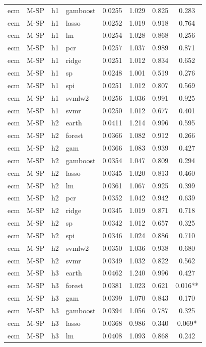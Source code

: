 \begin{ThreePartTable}
\begin{longtable}[t]{llclcccc}
ecm & M-SP & h1 & gamboost & 0.0255 & 1.029 & 0.825 & 0.283\\
ecm & M-SP & h1 & lasso & 0.0252 & 1.019 & 0.918 & 0.764\\
ecm & M-SP & h1 & lm & 0.0254 & 1.028 & 0.868 & 0.256\\
ecm & M-SP & h1 & pcr & 0.0257 & 1.037 & 0.989 & 0.871\\
ecm & M-SP & h1 & ridge & 0.0251 & 1.012 & 0.834 & 0.652\\
ecm & M-SP & h1 & sp & 0.0248 & 1.001 & 0.519 & 0.276\\
ecm & M-SP & h1 & spi & 0.0251 & 1.012 & 0.807 & 0.569\\
ecm & M-SP & h1 & svmlw2 & 0.0256 & 1.036 & 0.991 & 0.925\\
ecm & M-SP & h1 & svmr & 0.0250 & 1.012 & 0.677 & 0.401\\
\addlinespace
ecm & M-SP & h2 & earth & 0.0411 & 1.214 & 0.996 & 0.595\\
ecm & M-SP & h2 & forest & 0.0366 & 1.082 & 0.912 & 0.266\\
ecm & M-SP & h2 & gam & 0.0366 & 1.083 & 0.939 & 0.427\\
ecm & M-SP & h2 & gamboost & 0.0354 & 1.047 & 0.809 & 0.294\\
ecm & M-SP & h2 & lasso & 0.0345 & 1.020 & 0.813 & 0.460\\
ecm & M-SP & h2 & lm & 0.0361 & 1.067 & 0.925 & 0.399\\
ecm & M-SP & h2 & pcr & 0.0352 & 1.042 & 0.942 & 0.639\\
ecm & M-SP & h2 & ridge & 0.0345 & 1.019 & 0.871 & 0.718\\
ecm & M-SP & h2 & sp & 0.0342 & 1.012 & 0.657 & 0.325\\
ecm & M-SP & h2 & spi & 0.0346 & 1.024 & 0.886 & 0.710\\
ecm & M-SP & h2 & svmlw2 & 0.0350 & 1.036 & 0.938 & 0.680\\
ecm & M-SP & h2 & svmr & 0.0349 & 1.032 & 0.822 & 0.562\\
\addlinespace
ecm & M-SP & h3 & earth & 0.0462 & 1.240 & 0.996 & 0.427\\
ecm & M-SP & h3 & forest & 0.0381 & 1.023 & 0.621 & 0.016**\\
ecm & M-SP & h3 & gam & 0.0399 & 1.070 & 0.843 & 0.170\\
ecm & M-SP & h3 & gamboost & 0.0394 & 1.056 & 0.787 & 0.325\\
ecm & M-SP & h3 & lasso & 0.0368 & 0.986 & 0.340 & 0.069*\\
ecm & M-SP & h3 & lm & 0.0408 & 1.093 & 0.868 & 0.242\\

\end{longtable}
\end{ThreePartTable}
